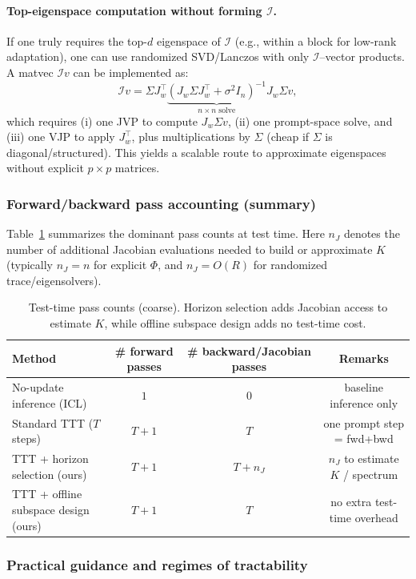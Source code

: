 \documentclass{article}
\theoremstyle{plain}
\theoremstyle{definition}
\theoremstyle{remark}
\begin{document}
\paragraph{Top-eigenspace computation without forming $\mathcal I$.}
If one truly requires the top-$d$ eigenspace of $\mathcal I$ (e.g., within a block for low-rank adaptation),
one can use randomized SVD/Lanczos with only $\mathcal I$--vector products.
A matvec $\mathcal I v$ can be implemented as:
\[
\mathcal I v
=
\Sigma J_w^\top \underbrace{(J_w\Sigma J_w^\top+\sigma^2 I_n)^{-1}}_{\text{$n\times n$ solve}}
J_w\Sigma v,
\]
which requires (i) one JVP to compute $J_w\Sigma v$, (ii) one prompt-space solve, and (iii) one VJP to apply $J_w^\top$,
plus multiplications by $\Sigma$ (cheap if $\Sigma$ is diagonal/structured). This yields a scalable route to
approximate eigenspaces without explicit $p\times p$ matrices.

\subsubsection{Forward/backward pass accounting (summary)}
Table~\ref{tab:app_compute_summary} summarizes the dominant pass counts at test time.
Here $n_J$ denotes the number of additional Jacobian evaluations needed to build or approximate $K$ (typically $n_J=n$
for explicit $\Phi$, and $n_J=O(R)$ for randomized trace/eigensolvers).

\begin{table}[t]
\centering
\small
\begin{tabular}{lccc}
\toprule
Method & \# forward passes & \# backward/Jacobian passes & Remarks \\
\midrule
No-update inference (ICL) & $1$ & $0$ & baseline inference only \\
Standard TTT ($T$ steps) & $T+1$ & $T$ & one prompt step = fwd+bwd \\
TTT + horizon selection (ours) & $T+1$ & $T + n_J$ & $n_J$ to estimate $K$ / spectrum \\
TTT + offline subspace design (ours) & $T+1$ & $T$ & no extra test-time overhead \\
\bottomrule
\end{tabular}
\caption{Test-time pass counts (coarse). Horizon selection adds Jacobian access to estimate $K$, while offline subspace
design adds no test-time cost.}
\label{tab:app_compute_summary}
\end{table}

\subsubsection{Practical guidance and regimes of tractability}
\end{document}
